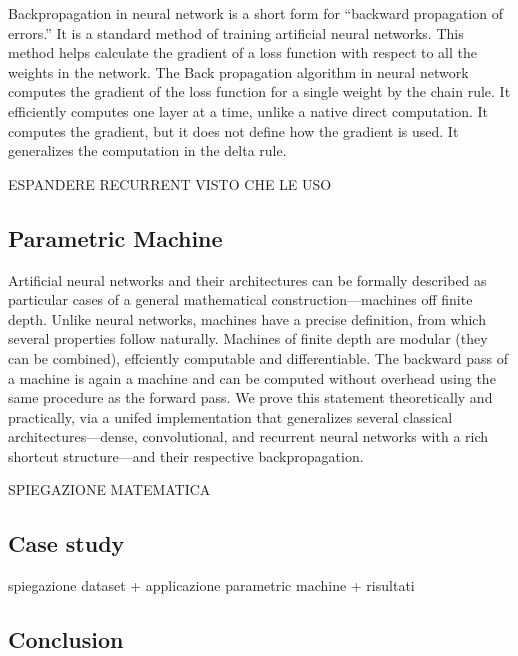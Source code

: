 \documentclass{article}
\begin{document}
Backpropagation in neural network is a short form for “backward propagation of errors.” It is a standard method of training artificial neural networks. This method helps calculate the gradient of a loss function with respect to all the weights in the network.
The Back propagation algorithm in neural network computes the gradient of the loss function for a single weight by the chain rule. It efficiently computes one layer at a time, unlike a native direct computation. It computes the gradient, but it does not define how the gradient is used. It generalizes the computation in the delta rule.



ESPANDERE RECURRENT VISTO CHE LE USO
\section{Parametric Machine}
Artificial neural networks and
their architectures can be formally described as particular cases of a general
mathematical construction—machines off finite depth. Unlike neural
networks, machines have a precise definition, from which several properties
follow naturally. Machines of finite depth are modular (they can be
combined), effciently computable and differentiable. The backward pass
of a machine is again a machine and can be computed without overhead
using the same procedure as the forward pass. We prove this statement
theoretically and practically, via a unifed implementation that generalizes
several classical architectures—dense, convolutional, and recurrent neural
networks with a rich shortcut structure—and their respective backpropagation.

SPIEGAZIONE MATEMATICA



\section{Case study}
spiegazione dataset + applicazione parametric machine + risultati

\section{Conclusion}

  
\chapter{}
\end{document}
